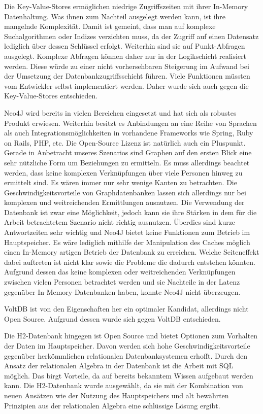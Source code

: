 Die Key-Value-Stores ermöglichen niedrige Zugriffszeiten mit ihrer In-Memory Datenhaltung. Was ihnen zum Nachteil ausgelegt werden kann, ist ihre mangelnde Komplexität. Damit ist gemeint, dass man auf komplexe Suchalgorithmen oder Indizes verzichten muss, da der Zugriff auf einen Datensatz lediglich über dessen Schlüssel erfolgt. Weiterhin sind sie auf Punkt-Abfragen ausgelegt. Komplexe Abfragen können daher nur in der Logikschicht realisiert werden. Diese würde zu einer nicht vorhersehbaren Steigerung im Aufwand bei der Umsetzung der Datenbankzugriffsschicht führen. Viele Funktionen müssten vom Entwickler selbst implementiert werden. Daher wurde sich auch gegen die Key-Value-Stores entschieden. 

Neo4J wird bereits in vielen Bereichen eingesetzt und hat sich als robustes Produkt erwiesen. Weiterhin besitzt es Anbindungen an eine Reihe von Sprachen als auch Integrationsmöglichkeiten in vorhandene Frameworks wie Spring, Ruby on Rails, PHP, etc. Die Open-Source Lizenz ist natürlich auch ein Pluspunkt. Gerade in Anbetracht unseres Szenarios sind Graphen auf den ersten Blick eine sehr nützliche Form um Beziehungen zu ermitteln. Es muss allerdings beachtet werden, dass keine komplexen Verknüpfungen über viele Personen hinweg zu ermittelt sind. Es wären immer nur sehr wenige Kanten zu betrachten. Die Geschwindigkeitsvorteile von Graphdatenbanken lassen sich allerdings nur bei komplexen und weitreichenden Ermittlungen ausnutzen. Die Verwendung der Datenbank ist zwar eine Möglichkeit, jedoch kann sie ihre Stärken in dem für die Arbeit betrachtetem Szenario nicht richtig ausnutzen. Überdies sind kurze Antwortzeiten sehr wichtig und Neo4J bietet keine Funktionen zum Betrieb im Hauptspeicher. Es wäre lediglich mithilfe der Manipulation des Caches möglich einen In-Memory artigen Betrieb der Datenbank zu erreichen. Welche Seiteneffekt dabei auftreten ist nicht klar sowie die Probleme die dadurch entstehen könnten. Aufgrund dessen das keine komplexen oder weitreichenden Verknüpfungen zwischen vielen Personen betrachtet werden und sie Nachteile in der Latenz gegenüber In-Memory-Datenbanken haben, konnte Neo4J nicht überzeugen.

VoltDB ist von den Eigenschaften her ein optimaler Kandidat, allerdings nicht Open Source. Aufgrund dessen wurde sich gegen VoltDB entschieden. 

Die H2-Datenbank hingegen ist Open Source und bietet Optionen zum 
Vorhalten der Daten im Hauptspeicher. Davon werden sich hohe Geschwindigkeitsvorteile gegenüber herkömmlichen relationalen Datenbanksystemen erhofft. Durch den Ansatz der relationalen Algebra in der Datenbank ist die Arbeit mit SQL möglich. Das birgt Vorteile, da auf bereits bekanntem Wissen aufgebaut werden kann. Die H2-Datenbank wurde ausgewählt, da sie mit der Kombination von neuen Ansätzen wie der Nutzung des Hauptspeichers und alt bewährten Prinzipien aus der relationalen Algebra eine schlüssige Lösung ergibt.